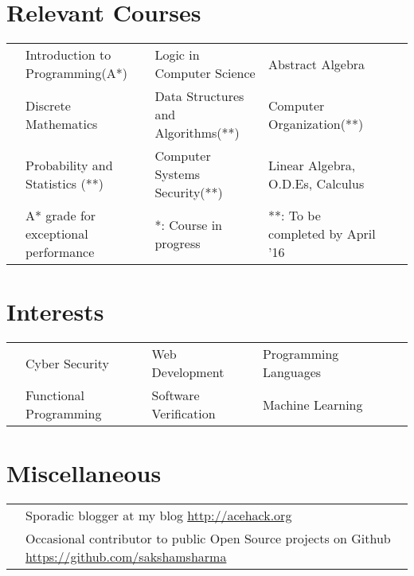 \documentclass[11pt,a4paper]{moderncv}
\begin{document}
\section*{Relevant Courses}
\begin{tabular}{L{0.05cm} L{6.2cm} L{6.5cm} L{7.5cm} L{8cm} L{13cm}}
  & Introduction to Programming(A*)  & Logic in Computer Science & Abstract Algebra\\
& Discrete Mathematics             & Data Structures and Algorithms(**) & Computer Organization(**)\\
& Probability and Statistics (**)  & Computer Systems Security(**) & Linear Algebra, O.D.Es, Calculus\\
  \vspace{0.3cm}
& \footnotesize{A* grade for exceptional performance}
& \footnotesize{*: Course in progress}
& \footnotesize{**: To be completed by April '16}
\end{tabular}

\section*{Interests}
\begin{tabular}{L{0.05cm} L{5.8cm} L{6.5cm} L{7.5cm} L{8cm} L{13cm}}
  & Cyber Security         & Web Development       & Programming Languages\\
  & Functional Programming & Software Verification & Machine Learning
\end{tabular}

\section*{Miscellaneous}
\begin{tabular}{L{0.05cm} l}
  & Sporadic blogger at my blog \url{http://acehack.org}\\
  & Occasional contributor to public Open Source projects on Github \url{https://github.com/sakshamsharma}
\end{tabular}
\end{document}
